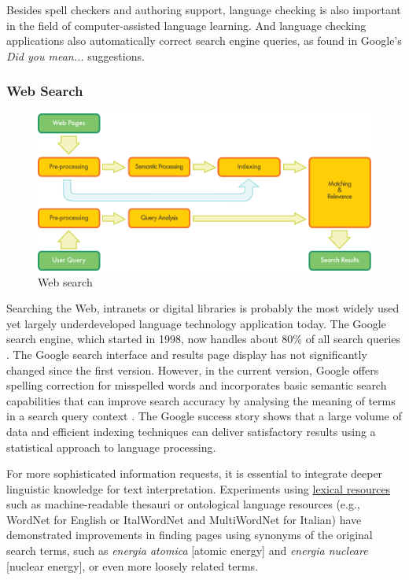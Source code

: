 \documentclass[]{../../metanetpaper}
\begin{document}
\begin{multicols}{2}


Besides spell checkers and authoring support, language checking is also important in the field of computer-assisted language learning. And language checking applications also automatically correct search engine queries, as found in Google's \emph{Did you mean...} suggestions.


\subsubsection{Web Search}

\begin{figure}[htb]
  \center
  \includegraphics[width=\textwidth]{../_media/english/web_search_architecture}
  \caption{Web search}
  \label{fig:websearcharch_en}
 \end{figure}

Searching the Web, intranets or digital libraries is probably the most widely used yet largely underdeveloped language technology application today. The Google search engine, which started in 1998, now handles about 80\% of all search queries \cite{spi1}. The Google search interface and results page display has not significantly changed since the first version. However, in the current version, Google offers spelling correction for misspelled words and incorporates basic semantic search capabilities that can improve search accuracy by analysing the meaning of terms in a search query context \cite{pc1}. The Google success story shows that a large volume of data and efficient indexing techniques can deliver satisfactory results using a statistical approach to language processing. 

For more sophisticated information requests, it is essential to integrate deeper linguistic knowledge for text interpretation. Experiments using \underline{lexical resources} such as machine-readable thesauri or ontological language resources (e.g., WordNet for English or ItalWordNet and MultiWordNet for Italian) have demonstrated improvements in finding pages using synonyms of the original search terms, such as \emph{energia atomica} [atomic energy] and \emph{energia nucleare} [nuclear energy], or even more loosely related terms.



\end{multicols}
\end{document}
